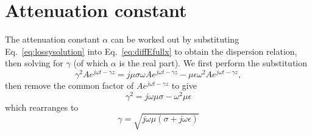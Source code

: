 \documentclass{tufte-handout}
\begin{document}
\section{Attenuation constant}
The attenuation constant $\alpha$ can be worked out by substituting Eq.~\ref{eq:lossysolution} into Eq.~\ref{eq:diffEfullx} to obtain the dispersion relation, then solving for $\gamma$ (of which $\alpha$ is the real part). 
We first perform the substitution
\begin{equation}
\gamma^{2}Ae^{j\omega{}t-\gamma{}z} = j\mu\sigma\omega{}Ae^{j\omega{}t-\gamma{}z} - \mu\epsilon\omega^{2}Ae^{j\omega{}t-\gamma{}z},
\end{equation}
then remove the common factor of $Ae^{j\omega{}t-\gamma{}z}$ to give
\begin{equation}
\gamma^{2} = j\omega\mu\sigma - \omega^{2}\mu\epsilon
\end{equation}
which rearranges to 
\begin{equation}
\gamma = \sqrt{j\omega\mu\left(\sigma + j\omega\epsilon\right)}\label{eq:gamma}
\end{equation}
\end{document}
